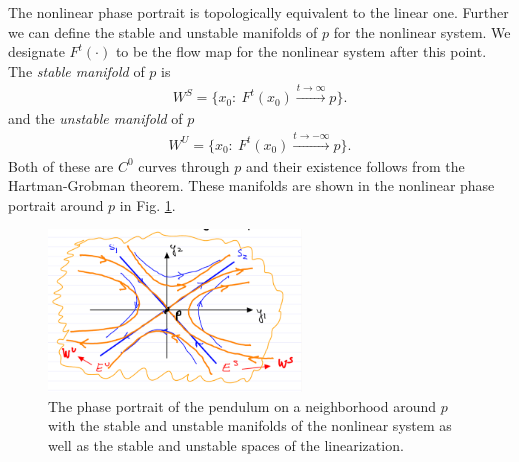 \begin{ex}
The nonlinear phase portrait is topologically equivalent to the linear one. Further we can define the stable and unstable manifolds of ${p} $ for the nonlinear system. We designate $F^{t}(\cdot)$ to be the flow map for the nonlinear system after this point.
The \emph{stable manifold} of ${p} $ is 
\begin{align}
	\boxed{
	W^{S} = \{ {x_0} :\ F^{t}({x_0} ) \xrightarrow{t \to \infty}{p} \}.
}
\end{align}
and the \emph{unstable manifold} of ${p} $
\begin{align}
	\boxed{
	W^{U}=\{{x_0} :\ F^{t}({x_0} ) \xrightarrow{t \to - \infty}{p}\}.
}
\end{align}
Both of these are $C^{0}$ curves through ${p}$ and their existence follows from the Hartman-Grobman theorem. These manifolds are shown in the nonlinear phase portrait around ${p} $ in Fig. \ref{fig:nonlin_pend_phase_p}. 
\begin{figure}[h!]
	\centering
	\includegraphics[width=0.6\textwidth]{figures/ch2/18nonlin_pend_phase_p.png}
	\caption{The phase portrait of the pendulum on a neighborhood around ${p} $ with the stable and unstable manifolds of the nonlinear system as well as the stable and unstable spaces of the linearization.}
	\label{fig:nonlin_pend_phase_p}
\end{figure}

\end{ex}

